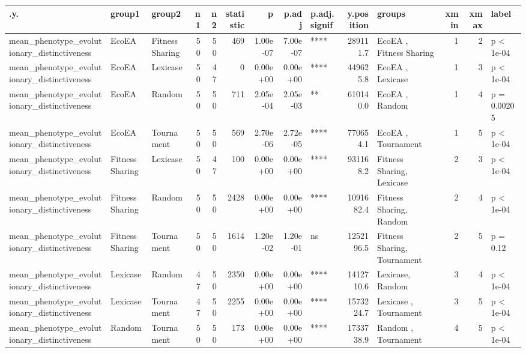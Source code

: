 \documentclass[]{book}
\begin{document}
\begin{table}
\centering
\begin{tabular}[t]{l|l|l|r|r|r|r|r|l|r|l|r|r|l}
\hline
.y. & group1 & group2 & n1 & n2 & statistic & p & p.adj & p.adj.signif & y.position & groups & xmin & xmax & label\\
\hline
mean\_phenotype\_evolutionary\_distinctiveness & EcoEA & Fitness Sharing & 50 & 50 & 469 & 1.00e-07 & 7.00e-07 & **** & 289111.7 & EcoEA          , Fitness Sharing & 1 & 2 & p < 1e-04\\
\hline
mean\_phenotype\_evolutionary\_distinctiveness & EcoEA & Lexicase & 50 & 47 & 0 & 0.00e+00 & 0.00e+00 & **** & 449625.8 & EcoEA   , Lexicase & 1 & 3 & p < 1e-04\\
\hline
mean\_phenotype\_evolutionary\_distinctiveness & EcoEA & Random & 50 & 50 & 711 & 2.05e-04 & 2.05e-03 & ** & 610140.0 & EcoEA , Random & 1 & 4 & p = 0.00205\\
\hline
mean\_phenotype\_evolutionary\_distinctiveness & EcoEA & Tournament & 50 & 50 & 569 & 2.70e-06 & 2.72e-05 & **** & 770654.1 & EcoEA     , Tournament & 1 & 5 & p < 1e-04\\
\hline
mean\_phenotype\_evolutionary\_distinctiveness & Fitness Sharing & Lexicase & 50 & 47 & 100 & 0.00e+00 & 0.00e+00 & **** & 931168.2 & Fitness Sharing, Lexicase & 2 & 3 & p < 1e-04\\
\hline
mean\_phenotype\_evolutionary\_distinctiveness & Fitness Sharing & Random & 50 & 50 & 2428 & 0.00e+00 & 0.00e+00 & **** & 1091682.4 & Fitness Sharing, Random & 2 & 4 & p < 1e-04\\
\hline
mean\_phenotype\_evolutionary\_distinctiveness & Fitness Sharing & Tournament & 50 & 50 & 1614 & 1.20e-02 & 1.20e-01 & ns & 1252196.5 & Fitness Sharing, Tournament & 2 & 5 & p = 0.12\\
\hline
mean\_phenotype\_evolutionary\_distinctiveness & Lexicase & Random & 47 & 50 & 2350 & 0.00e+00 & 0.00e+00 & **** & 1412710.6 & Lexicase, Random & 3 & 4 & p < 1e-04\\
\hline
mean\_phenotype\_evolutionary\_distinctiveness & Lexicase & Tournament & 47 & 50 & 2255 & 0.00e+00 & 0.00e+00 & **** & 1573224.7 & Lexicase  , Tournament & 3 & 5 & p < 1e-04\\
\hline
mean\_phenotype\_evolutionary\_distinctiveness & Random & Tournament & 50 & 50 & 173 & 0.00e+00 & 0.00e+00 & **** & 1733738.9 & Random    , Tournament & 4 & 5 & p < 1e-04\\
\hline
\end{tabular}
\end{table}
\end{document}

